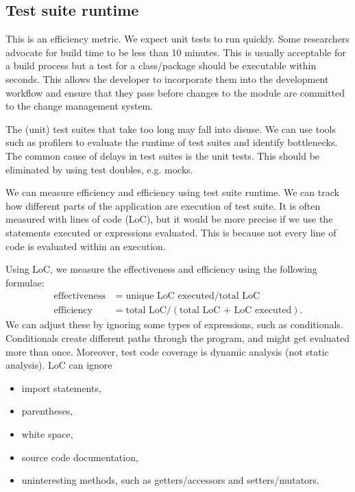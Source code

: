 \documentclass[a4paper, openany]{memoir}
\begin{document}
\subsection{Test suite runtime}
This is an efficiency metric. 
We expect unit tests to run quickly. Some researchers advocate for build time to be less than 10 minutes. This is usually acceptable for a build process but a test for a class/package should be executable within seconds. This allows the developer to incorporate them into the development workflow and ensure that they pass before changes to the module are committed to the change management system.

The (unit) test suites that take too long may fall into disuse. We can use tools such as profilers to evaluate the runtime of test suites and identify bottlenecks. The common cause of delays in test suites is the unit tests. This should be eliminated by using test doubles, e.g. mocks.

We can measure efficiency and efficiency using test suite runtime. We can track how different parts of the application are execution of test suite. It is often measured with lines of code (LoC), but it would be more precise if we use the statements executed or expressions evaluated. This is because not every line of code is evaluated within an execution.

Using LoC, we measure the effectiveness and efficiency using the following formulae:
\begin{align*}
    \text{effectiveness} &= \text{unique LoC executed}/\text{total LoC} \\
    \text{efficiency} &= \text{total LoC}/(\text{total LoC + LoC executed}).
\end{align*}
We can adjust these by ignoring some types of expressions, such as conditionals. Conditionals create different paths through the program, and might get evaluated more than once. Moreover, test code coverage is dynamic analysis (not static analysis). LoC can ignore 
\begin{itemize}
    \item import statements, 
    \item parentheses, 
    \item white space, 
    \item source code documentation, 
    \item uninteresting methods, such as getters/accessors and setters/mutators.
\end{itemize}
\end{document}
